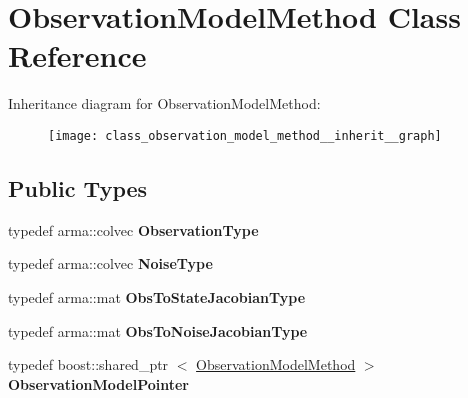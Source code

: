 \hypertarget{class_observation_model_method}{\section{\-Observation\-Model\-Method \-Class \-Reference}
\label{class_observation_model_method}
}


\-Inheritance diagram for \-Observation\-Model\-Method\-:\nopagebreak
\begin{figure}[H]
\begin{center}
\leavevmode
\texttt{[image: class\_observation\_model\_method\_\_inherit\_\_graph]}
\end{center}
\end{figure}
\subsection*{\-Public \-Types}
\begin{DoxyCompactItemize}
\item 
\hypertarget{class_observation_model_method_af5a5953c0f7b82691d36f353ed08aa03}{typedef arma\-::colvec {\bfseries \-Observation\-Type}}\label{class_observation_model_method_af5a5953c0f7b82691d36f353ed08aa03}

\item 
\hypertarget{class_observation_model_method_a380b1d02a13fa85f2a4d8610b648d446}{typedef arma\-::colvec {\bfseries \-Noise\-Type}}\label{class_observation_model_method_a380b1d02a13fa85f2a4d8610b648d446}

\item 
\hypertarget{class_observation_model_method_a1c83d0c9794c0316818c0ee87fba4a24}{typedef arma\-::mat {\bfseries \-Obs\-To\-State\-Jacobian\-Type}}\label{class_observation_model_method_a1c83d0c9794c0316818c0ee87fba4a24}

\item 
\hypertarget{class_observation_model_method_ac1a379fcac7d5d5d67391362eb91c252}{typedef arma\-::mat {\bfseries \-Obs\-To\-Noise\-Jacobian\-Type}}\label{class_observation_model_method_ac1a379fcac7d5d5d67391362eb91c252}

\item 
\hypertarget{class_observation_model_method_ad119ee691daccc6a1410de7a18a93b7f}{typedef boost\-::shared\-\_\-ptr\*
$<$ \hyperlink{class_observation_model_method}{\-Observation\-Model\-Method} $>$ {\bfseries \-Observation\-Model\-Pointer}}\label{class_observation_model_method_ad119ee691daccc6a1410de7a18a93b7f}

\end{DoxyCompactItemize}
